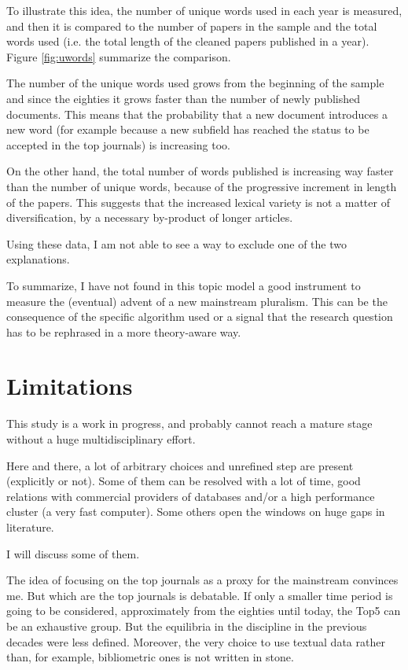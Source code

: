 \documentclass[a4paper, 11pt, headings=standardclasses, tablecaptionsbelow]{scrartcl}
\begin{document}
To illustrate this idea, the number of unique words used in each year is measured, and then it is compared to the number of papers in the sample and the total words used (i.e. the total length of the cleaned papers published in a year). Figure \ref{fig:uwords} summarize the comparison.

The number of the unique words used grows from the beginning of the sample and since the eighties it grows faster than the number of newly published documents. This means that the probability that a new document introduces a new word (for example because a new subfield has reached the status to be accepted in the top journals) is increasing too.

On the other hand, the total number of words published is increasing way faster than the number of unique words, because of the progressive increment in length of the papers. This suggests that the increased lexical variety is not a matter of diversification, by a necessary by-product of longer articles.

Using these data, I am not able to see a way to exclude one of the two explanations.

To summarize, I have not found in this topic model a good instrument to measure the (eventual) advent of a new mainstream pluralism. This can be the consequence of the specific algorithm used or a signal that the research question has to be rephrased in a more theory-aware way.

\section{Limitations}
This study is a work in progress, and probably cannot reach a mature stage without a huge multidisciplinary effort.

Here and there, a lot of arbitrary choices and unrefined step are present (explicitly or not).
Some of them can be resolved with a lot of time, good relations with commercial providers of databases and/or a high performance cluster (a very fast computer).
Some others open the windows on huge gaps in literature.

I will discuss some of them.

The idea of focusing on the top journals as a proxy for the mainstream convinces me. But which are the top journals is debatable.
If only a smaller time period is going to be considered, approximately from the eighties until today, the Top5 can be an exhaustive group. But the equilibria in the discipline in the previous decades were less defined.
Moreover, the very choice to use textual data rather than, for example, bibliometric ones is not written in stone.
\end{document}
